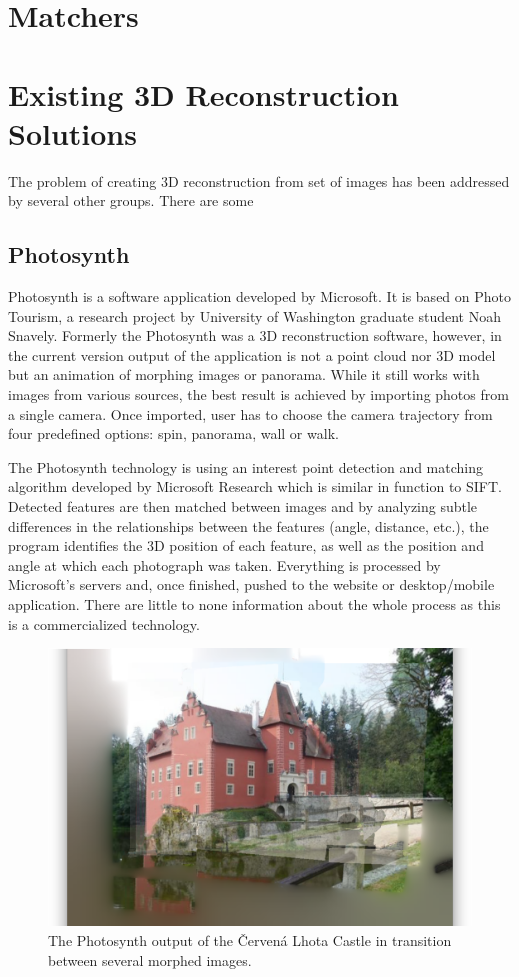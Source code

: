 \section{Matchers}

\section{Existing 3D Reconstruction Solutions}
The problem of creating 3D reconstruction from set of images has been addressed by several other groups. There are some 
\subsection*{Photosynth}
Photosynth is a software application developed by Microsoft. It is based on Photo Tourism, a research project by University of Washington graduate student Noah Snavely. Formerly the Photosynth was a 3D reconstruction software, however, in the current version output of the application is not a point cloud nor 3D model but an animation of morphing images or panorama. While it still works with images from various sources, the best result is achieved by importing photos from a single camera. Once imported, user has to choose the camera trajectory from four predefined options: spin, panorama, wall or walk. 

The Photosynth technology is using an interest point detection and matching algorithm developed by Microsoft Research which is similar in function to SIFT. Detected features are then matched between images and by analyzing subtle differences in the relationships between the features (angle, distance, etc.), the program identifies the 3D position of each feature, as well as the position and angle at which each photograph was taken. Everything is processed by Microsoft's servers and, once finished, pushed to the website or desktop/mobile application. There are little to none information about the whole process as this is a commercialized technology. \cite{www:photosynth}

\begin{figure}[ht]
	\begin{center}
		\includegraphics[keepaspectratio,width=14cm]{fig/Photosynth.png}
	\end{center}
	\caption{The Photosynth output of the Červená Lhota Castle in transition between several morphed images.}
	\label{fig:visualsfm}
\end{figure}

